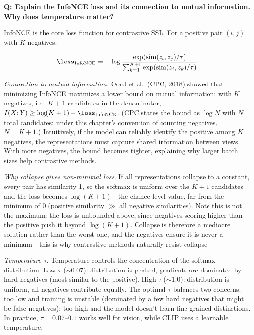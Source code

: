 \begin{interviewq}
\textbf{Q: Explain the InfoNCE loss and its connection to mutual information. Why does temperature matter?}

 \quad {} \quad \badgefreq{\freqmed}

\stronganswer InfoNCE is the core loss function for contrastive SSL. For a positive pair $(i, j)$ with $K$ negatives:

$$\loss_{\text{InfoNCE}} = -\log \frac{\exp(\text{sim}(z_i, z_j)/\tau)}{\sum_{k=1}^{K+1} \exp(\text{sim}(z_i, z_k)/\tau)}$$

\textit{Connection to mutual information.} Oord et al.\ (CPC, 2018) showed that minimizing InfoNCE maximizes a lower bound on mutual information: with $K$ negatives, i.e.\ $K+1$ candidates in the denominator, $I(X; Y) \geq \log(K+1) - \loss_{\text{InfoNCE}}$. (CPC states the bound as $\log N$ with $N$ total candidates; under this chapter's convention of counting negatives, $N = K+1$.) Intuitively, if the model can reliably identify the positive among $K$ negatives, the representations must capture shared information between views. With more negatives, the bound becomes tighter, explaining why larger batch sizes help contrastive methods.

\textit{Why collapse gives non-minimal loss.} If all representations collapse to a constant, every pair has similarity 1, so the softmax is uniform over the $K+1$ candidates and the loss becomes $\log(K+1)$---the chance-level value, far from the minimum of 0 (positive similarity $\gg$ all negative similarities). Note this is not the maximum: the loss is unbounded above, since negatives scoring higher than the positive push it beyond $\log(K+1)$. Collapse is therefore a mediocre solution rather than the worst one, and the negatives ensure it is never a minimum---this is why contrastive methods naturally resist collapse.

\textit{Temperature $\tau$.} Temperature controls the concentration of the softmax distribution. Low $\tau$ ($\sim$0.07): distribution is peaked, gradients are dominated by hard negatives (most similar to the positive). High $\tau$ ($\sim$1.0): distribution is uniform, all negatives contribute equally. The optimal $\tau$ balances two concerns: too low and training is unstable (dominated by a few hard negatives that might be false negatives); too high and the model doesn't learn fine-grained distinctions. In practice, $\tau = 0.07$--$0.1$ works well for vision, while CLIP uses a learnable temperature.


\end{interviewq}
